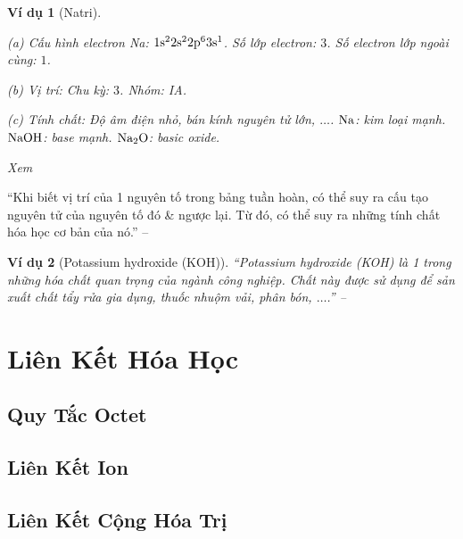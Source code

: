 \documentclass[oneside]{book}
\numberwithin{equation}{section}
\newtheorem{vidu}{Ví dụ}[section]
\begin{document}
\begin{vidu}[Natri]
	\begin{enumerate*}
		\item[(a)] \emph{Cấu hình electron Na:} $\rm 1s^22s^22p^63s^1$. Số lớp electron: $3$. Số electron lớp ngoài cùng: $1$.
		\item[(b)] \emph{Vị trí:} Chu kỳ: $3$. Nhóm: IA.
		\item[(c)] \emph{Tính chất:} Độ âm điện nhỏ, bán kính nguyên tử lớn, $\ldots$. $\rm Na$: kim loại mạnh. $\rm NaOH$: base mạnh. $\rm Na_2O$: basic oxide.
	\end{enumerate*}
	Xem \cite[Hình 7.1: \textsf{Mối quan hệ vị trí, cấu hình electron \& tính chất của sodium}, p. 50]{SGK_Hoa_Hoc_10_Chan_Troi_Sang_Tao}
\end{vidu}
``Khi biết vị trí của 1 nguyên tố trong bảng tuần hoàn, có thể suy ra cấu tạo nguyên tử của nguyên tố đó \& ngược lại. Từ đó, có thể suy ra những tính chất hóa học cơ bản của nó.'' -- \cite[p. 50]{SGK_Hoa_Hoc_10_Chan_Troi_Sang_Tao}

\begin{vidu}[Potassium hydroxide (KOH)]
	``\emph{Potassium hydroxide (KOH)} là 1 trong những hóa chất quan trọng của ngành công nghiệp. Chất này được sử dụng để sản xuất chất tẩy rửa gia dụng, thuốc nhuộm vải, phân bón, $\ldots$.'' -- \cite[p. 50]{SGK_Hoa_Hoc_10_Chan_Troi_Sang_Tao}
\end{vidu}


\chapter{Liên Kết Hóa Học}

\section{Quy Tắc Octet}


\section{Liên Kết Ion}


\section{Liên Kết Cộng Hóa Trị}
\end{document}
